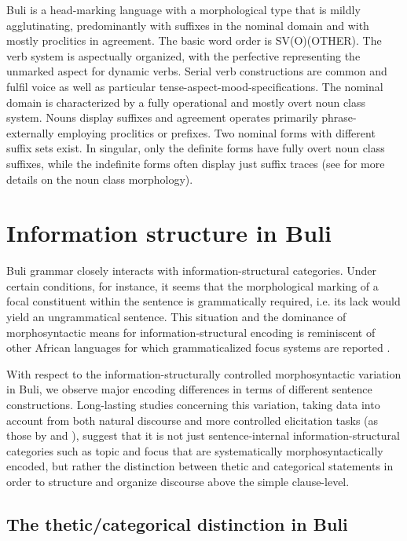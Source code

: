 \documentclass[output=paper]{langsci/langscibook}
\begin{document}
Buli is a head-marking language with a morphological type that is mildly agglutinating, predominantly with suffixes in the nominal domain and with mostly proclitics in agreement. The basic word order is SV(O)(OTHER). The verb system is aspectually organized, with the perfective representing the unmarked aspect for dynamic verbs. Serial verb constructions are common and fulfil voice as well as particular tense-aspect-mood-specifications. The nominal domain is characterized by a fully operational and mostly overt noun class system. Nouns display suffixes and agreement operates primarily phrase-externally employing proclitics or prefixes. Two nominal forms with different suffix sets exist. In singular, only the definite forms have fully overt noun class suffixes, while the indefinite forms often display just suffix traces (see \citealt{Schwarz2007} for more details on the noun class morphology).

\section{Information structure in Buli}\label{sec:schwarz:3}

Buli grammar closely interacts with information-structural categories. Under certain conditions, for instance, it seems that the morphological marking of a focal constituent within the sentence is grammatically required, i.e. its lack would yield an ungrammatical sentence. This situation and the dominance of morphosyntactic means for information-structural encoding is reminiscent of other African languages for which grammaticalized focus systems are reported \citep{HymanWatters1984,Robert2000,Wolff2005}. 

With respect to the information-structurally controlled morphosyntactic variation in Buli, we observe major encoding differences in terms of different sentence constructions. Long-lasting studies concerning this variation, taking data into account from both natural discourse and more controlled elicitation tasks (as those by \citealt{SkopeteasEtAl2006} and \citealt{Schwarz2007}), suggest that it is not just sentence-internal information-structural categories such as topic and focus that are systematically morphosyntactically encoded, but rather the distinction between thetic and categorical statements in order to structure and organize discourse above the simple clause-level. 

\subsection{The thetic/categorical distinction in Buli}\label{sec:schwarz:3.1}
\end{document}
